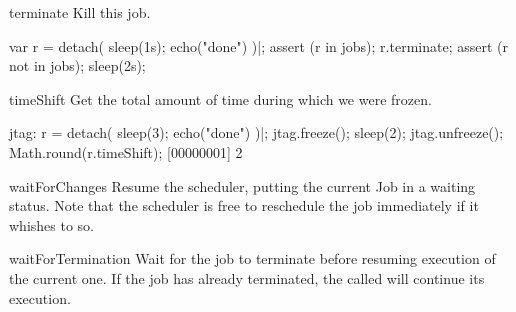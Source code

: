 \begin{urbiscriptapi}
\item[terminate]  Kill this job.
\begin{urbiscript}
var r = detach({ sleep(1s); echo("done") })|;
assert (r in jobs);
r.terminate;
assert (r not in jobs);
sleep(2s);
\end{urbiscript}

\item[timeShift]
  Get the total amount of time during which we were frozen.
\begin{urbiscript}
jtag: r = detach({ sleep(3); echo("done") })|;
jtag.freeze();
sleep(2);
jtag.unfreeze();
Math.round(r.timeShift);
[00000001] 2
\end{urbiscript}

\item[waitForChanges]
  Resume the scheduler, putting the current Job in a waiting status.
  Note that the scheduler is free to reschedule the job immediately if it
  whishes to so.

\item[waitForTermination]
  Wait for the job to terminate before resuming execution of the current one.
  If the job has already terminated, the called will continue its execution.

\end{urbiscriptapi}


